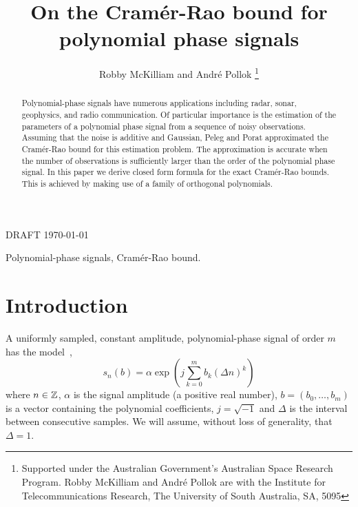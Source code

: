 \documentclass[journal,10pt]{IEEEtran}
\begin{document}
\title{On the Cram\'{e}r-Rao bound for polynomial phase signals}

\author{Robby McKilliam and Andr\'{e} Pollok%
\thanks{Supported under the Australian Government's Australian Space Research Program.
Robby McKilliam and Andr\'{e} Pollok are with the Institute for Telecommunications Research, The University of South Australia, SA, 5095}
}
%
{DRAFT \today}



\maketitle


\begin{abstract}
Polynomial-phase signals have numerous applications including radar, sonar, geophysics, and radio communication.  Of particular importance is the estimation of the parameters of a polynomial phase signal from a sequence of noisy observations.  Assuming that the noise is additive and Gaussian,  Peleg and Porat approximated the Cram\'{e}r-Rao bound for this estimation problem.  The approximation is accurate when the number of observations is sufficiently larger than the order of the polynomial phase signal.  In this paper we derive closed form formula for the exact Cram\'{e}r-Rao bounds.  This is achieved by making use of a family of orthogonal polynomials.
\end{abstract}

\begin{IEEEkeywords}
Polynomial-phase signals, Cram\'{e}r-Rao bound.
\end{IEEEkeywords}



\section{Introduction}

A uniformly sampled, constant amplitude, polynomial-phase signal of order $m$ has the model~\cite{Peleg_DPT_1995, Peleg1991_CRB_PPS_1991, Peleg1991_est_class_PPS_1991, Rihaczek1996},
\[
s_n(b) = \alpha \exp\left( j \sum_{k = 0}^{m}{b_k (\Delta n)^k}\right)
\]
where $n \in {\mathbb Z}$, $\alpha$ is the signal amplitude (a positive real number), $b=(b_0, \dots, b_m)$ is a vector containing the polynomial coefficients, $j = \sqrt{-1}$ and $\Delta$ is the interval between consecutive samples.  We will assume, without loss of generality, that $\Delta = 1$.
\end{document}
